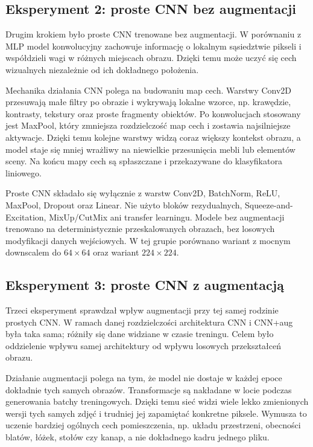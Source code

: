 \documentclass[12pt,a4paper]{article}
\begin{document}
\subsection{Eksperyment 2: proste CNN bez augmentacji}

Drugim krokiem było proste CNN trenowane bez augmentacji. W porównaniu z MLP model konwolucyjny zachowuje informację o lokalnym sąsiedztwie pikseli i współdzieli wagi w różnych miejscach obrazu. Dzięki temu może uczyć się cech wizualnych niezależnie od ich dokładnego położenia.

Mechanika działania CNN polega na budowaniu map cech. Warstwy Conv2D przesuwają małe filtry po obrazie i wykrywają lokalne wzorce, np. krawędzie, kontrasty, tekstury oraz proste fragmenty obiektów. Po konwolucjach stosowany jest MaxPool, który zmniejsza rozdzielczość map cech i zostawia najsilniejsze aktywacje. Dzięki temu kolejne warstwy widzą coraz większy kontekst obrazu, a model staje się mniej wrażliwy na niewielkie przesunięcia mebli lub elementów sceny. Na końcu mapy cech są spłaszczane i przekazywane do klasyfikatora liniowego.

Proste CNN składało się wyłącznie z warstw Conv2D, BatchNorm, ReLU, MaxPool, Dropout oraz Linear. Nie użyto bloków rezydualnych, Squeeze-and-Excitation, MixUp/CutMix ani transfer learningu. Modele bez augmentacji trenowano na deterministycznie przeskalowanych obrazach, bez losowych modyfikacji danych wejściowych. W tej grupie porównano wariant z mocnym downscalem do \(64 \times 64\) oraz wariant \(224 \times 224\).

\subsection{Eksperyment 3: proste CNN z augmentacją}

Trzeci eksperyment sprawdzał wpływ augmentacji przy tej samej rodzinie prostych CNN. W ramach danej rozdzielczości architektura CNN i CNN+aug była taka sama; różniły się dane widziane w czasie treningu. Celem było oddzielenie wpływu samej architektury od wpływu losowych przekształceń obrazu.

Działanie augmentacji polega na tym, że model nie dostaje w każdej epoce dokładnie tych samych obrazów. Transformacje są nakładane w locie podczas generowania batchy treningowych. Dzięki temu sieć widzi wiele lekko zmienionych wersji tych samych zdjęć i trudniej jej zapamiętać konkretne piksele. Wymusza to uczenie bardziej ogólnych cech pomieszczenia, np. układu przestrzeni, obecności blatów, łóżek, stołów czy kanap, a nie dokładnego kadru jednego pliku.
\end{document}
